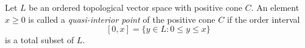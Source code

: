 Let $L$ be an ordered topological vector space with positive cone $C$. An element $x \geq 0$ is called a \emph{quasi-interior point} of the positive cone $C$ if the order interval
$$
[0, x] = \{y \in L : 0 \leq y \leq x\}
$$
is a total subset of $L$.
